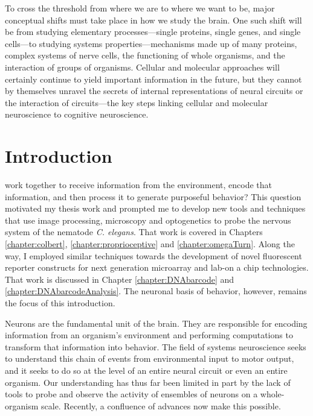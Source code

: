 \begin{savequote}[75mm] 
To cross the threshold from where we are to where we want to be, major conceptual shifts must take place in how we study the brain. One such shift will be from studying elementary processes---single proteins, single genes, and single cells---to studying systems properties---mechanisms made up of many proteins, complex systems of nerve cells, the functioning of whole organisms, and the interaction of groups of organisms. Cellular and molecular approaches will certainly continue to yield important information in the future, but they cannot by themselves unravel the secrets of internal representations of neural circuits or the interaction of circuits---the key steps linking cellular and molecular neuroscience to cognitive neuroscience. 
\end{savequote}



\chapter{Introduction}

 work together to receive information from the environment, encode that information, and then process it to generate  purposeful behavior?  This question motivated my thesis work and prompted me to develop new tools and techniques that use image processing, microscopy and optogenetics to probe the nervous system of the nematode \emph{C. elegans}. That work is covered in Chapters \ref{chapter:colbert}, \ref{chapter:proprioceptive} and  \ref{chapter:omegaTurn}. Along the way, I employed similar techniques  towards the development of  novel fluorescent reporter constructs for next generation microarray and lab-on a chip technologies. That work is discussed in Chapter \ref{chapter:DNAbarcode} and \ref{chapter:DNAbarcodeAnalysis}. The neuronal basis of behavior, however, remains the focus of this introduction.

Neurons are the fundamental unit of the brain.  They are responsible for encoding information from an organism's environment and performing computations to transform that information into  behavior.  The field of systems neuroscience seeks to understand this chain of events from environmental input to motor output, and it seeks to do so at the level of an entire neural circuit or even an entire organism. Our understanding has thus far been limited in part by the lack of tools to probe and observe the activity of ensembles of neurons on a whole-organism scale. Recently, a confluence of advances now make this possible.


